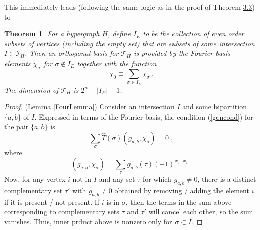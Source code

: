 \documentclass[10pt,a4paper]{amsart}
\newcommand{\cal}{\mathcal}
\newtheorem{theorem}{Theorem}[section]
\theoremstyle{definition}
\begin{document}
This immediately leads (following the same logic as in the proof of Theorem \href{https://arxiv.org/abs/2508.21276v1}{3.3}) to
\begin{theorem}\label{thm:Fourier2}
For a hypergraph $H$, define $I_E$ to be the collection of even order subsets of vertices (including the empty set) that are subsets of some intersection $I \in {\cal I}_H$. Then an orthogonal basis for ${\cal T}_H$ is provided by the Fourier basis elements $\chi_\sigma$ for $\sigma \notin I_E$ together with the function
\[
\chi_0 \equiv \sum_{\sigma \in I_E} \chi_\sigma \; . 
\]
The dimension of ${\cal T}_H$ is $2^n - |I_E| + 1$.
\end{theorem}



\begin{proof} (Lemma \ref{FourLemma})
Consider an intersection $I$ and some bipartition $\{a,b\}$ of $I$.
Expressed in terms of the Fourier basis, the condition (\ref{gencond}) for the pair $\{a,b\}$ is
\begin{equation}
\label{multicond}
\sum_\sigma \hat{T}(\sigma) (g_{a,b}, \chi_\sigma) = 0 \; ,
\end{equation}
where
\[
(g_{a,b}, \chi_\sigma) = \sum_\tau g_{a,b}(\tau)  (-1)^{x_\sigma \cdot x_\tau} \; .
\]
Now, for any vertex $i$ not in $I$ and any set $\tau$ for which $g_{a,b} \ne 0$, there is a distinct complementary set $\tau'$ with $g_{a,b} \ne 0$ obtained by removing / adding the element $i$ if it is present / not present. If $i$ is in $\sigma$, then the terms in the sum above corresponding to complementary sets $\tau$ and $\tau'$ will cancel each other, so the sum vanishes. Thus, inner prduct above is nonzero only for $\sigma \subset I$. 


\end{proof}
\end{document}
